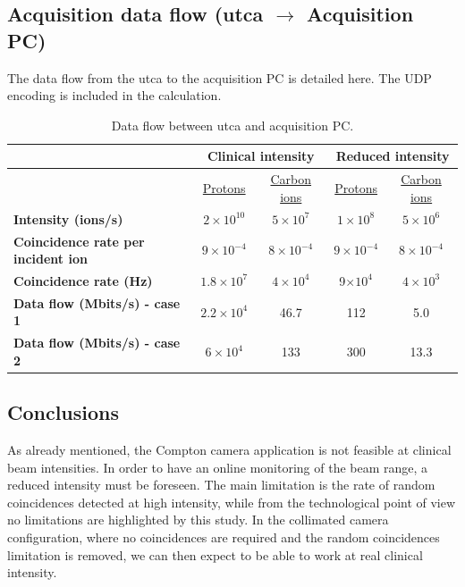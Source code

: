 \subsection{Acquisition data flow (\gls{utca} $\rightarrow$ Acquisition PC)}\label{chapappA::subsec::daqDataFlow}
The data flow from the \gls{utca} to the acquisition PC is detailed here. The UDP encoding is included in the calculation.

\begin{table} [!htbp]
\centering
\caption{Data flow between \gls{utca} and acquisition PC.}
\label{chapappA::tab::dataFlowuTCAPC}
\begin{tabular}{m{3.5cm} c c c c}
\toprule
\rowcolor{myColorMainA!20}
		&\multicolumn{2}{c}{	\textbf{Clinical intensity}} &\multicolumn{2}{c}{ \textbf{Reduced intensity}} \\
\midrule
		& \underline{Protons}& \underline{Carbon ions} & \underline{Protons}& \underline{Carbon ions} \\
\midrule
\textbf{Intensity (ions/s)}		& $2\times10^{10}$	&$5\times10^{7}$  & $1\times10^{8}$& $5\times10^{6}$ \\
\textbf{Coincidence rate per incident ion}		& $9\times10^{-4}$&  $8\times10^{-4}$&  $9\times10^{-4}$& $8\times10^{-4}$ \\
\textbf{Coincidence rate (Hz)}		& $1.8\times10^{7}$ &  $4\times10^{4}$ &  9$\times10^{4}$ & $4\times10^{3}$ \\
\textbf{Data flow (Mbits/s) - case 1}		& $2.2\times10^{4}$ &  46.7&  112 & 5.0\\
\textbf{Data flow (Mbits/s) - case 2}		& $6\times10^{4}$ &  133 &  300 & 13.3\\
\bottomrule
\end{tabular}
\end{table}

\subsection{Conclusions}\label{chapappA::subsec::conclusions}
As already mentioned, the Compton camera application is not feasible at clinical beam intensities. \newline
In order to have an online monitoring of the beam range, a reduced intensity must be foreseen. The main limitation is the rate of random coincidences detected at high intensity, while from the technological point of view no limitations are highlighted by this study. In the collimated camera configuration, where no coincidences are required and the random coincidences limitation is removed, we can then expect to be able to work at real clinical intensity.


